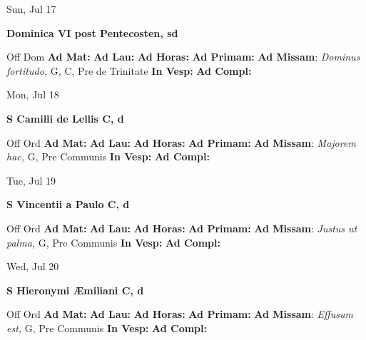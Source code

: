\documentclass[10pt]{article}
\begin{document}
\begin{minipage}{3.5in}
\vspace{2em}\begin{center}
Sun, Jul 17
\end{center}\textbf{ \large Dominica VI post Pentecosten, \textnormal{\normalsize sd}}
\begin{justify}
Off Dom
\textbf{Ad Mat: }
\textbf{Ad Lau: }
\textbf{Ad Horas: }
\textbf{Ad Primam: }
\textbf{Ad Missam}: \textit{Dominus fortitudo,} G, C, Pre de Trinitate
\textbf{In Vesp: }
\textbf{Ad Compl: }\end{justify}
\end{minipage}



\begin{minipage}{3.5in}
\vspace{2em}\begin{center}
Mon, Jul 18
\end{center}\textbf{ \large S Camilli de Lellis C, \textnormal{\normalsize d}}
\begin{justify}
Off Ord
\textbf{Ad Mat: }
\textbf{Ad Lau: }
\textbf{Ad Horas: }
\textbf{Ad Primam: }
\textbf{Ad Missam}: \textit{Majorem hac,} G, Pre Communis
\textbf{In Vesp: }
\textbf{Ad Compl: }\end{justify}
\end{minipage}



\begin{minipage}{3.5in}
\vspace{2em}\begin{center}
Tue, Jul 19
\end{center}\textbf{ \large S Vincentii a Paulo C, \textnormal{\normalsize d}}
\begin{justify}
Off Ord
\textbf{Ad Mat: }
\textbf{Ad Lau: }
\textbf{Ad Horas: }
\textbf{Ad Primam: }
\textbf{Ad Missam}: \textit{Justus ut palma,} G, Pre Communis
\textbf{In Vesp: }
\textbf{Ad Compl: }\end{justify}
\end{minipage}



\begin{minipage}{3.5in}
\vspace{2em}\begin{center}
Wed, Jul 20
\end{center}\textbf{ \large S Hieronymi Æmiliani C, \textnormal{\normalsize d}}
\begin{justify}
Off Ord
\textbf{Ad Mat: }
\textbf{Ad Lau: }
\textbf{Ad Horas: }
\textbf{Ad Primam: }
\textbf{Ad Missam}: \textit{Effusum est,} G, Pre Communis
\textbf{In Vesp: }
\textbf{Ad Compl: }\end{justify}
\end{minipage}
\end{document}
